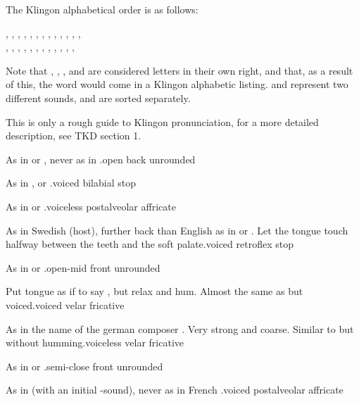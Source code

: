 
\noindent The Klingon alphabetical order is as follows:

\begin{center}
, , , , , , , , ,
, , , , \\
, , , , , , , , ,
, , , 
\end{center}

\noindent Note that , , ,  and  are
considered letters in their own right, and that, as a result of this,
the word  would come   in a Klingon
alphabetic listing.  and  represent two different sounds, and
are sorted separately.

This is only a rough guide to Klingon pronunciation, for a more
detailed description, see TKD section 1.

\vspace{3mm}

%
  {\textipa{[A]} As in  or , never as in
  .}{open back unrounded}

%
  {\textipa{[b]} As in ,  or
  .}{voiced bilabial stop}

%
  {\textipa{[\t{tS}]} As in  or
  .}{voiceless postalveolar affricate}

%
  {\textipa{[\:d]} As in Swedish  (host), further back
  than English  as in  or . Let the
  tongue touch halfway between the teeth and the soft palate.}{voiced
  retroflex stop}

%
  {\textipa{[E]} As in  or .}{open-mid front
  unrounded}

%
  {\textipa{[G]} Put tongue as if to say , but relax and
  hum. Almost the same as  but voiced.}{voiced velar fricative}

%
  {\textipa{[x]} As in the name of the german composer
  . Very strong and coarse. Similar to  but without
  humming.}{voiceless velar fricative}

%
  {\textipa{[I]} As in  or .}{semi-close
  front unrounded}

%
  {\textipa{[\t{dZ}]} As in  (with an initial
  -sound), never as in French .}{voiced postalveolar
  affricate}

